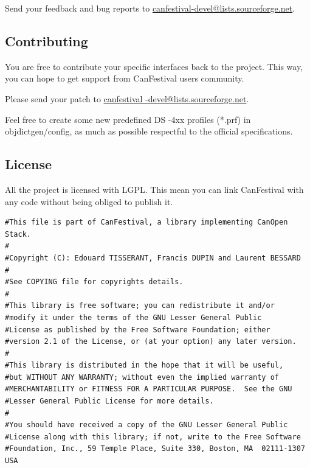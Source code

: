 \documentclass[12pt,english,a4paper]{book}
\begin{document}
Send your feedback and bug reports to \href{mailto:canfestival-devel@lists.sourceforge.net}{canfestival-devel@lists.sourceforge.net}.

\subsection{Contributing}

You are free to contribute your specific interfaces back to the project.
This way, you can hope to get support from CanFestival users community.

Please send your patch to \href{mailto:canfestival-devel@lists.sourceforge.net}{canfestival
-devel@lists.sourceforge.net}.

Feel free to create some new predefined DS -4xx profiles ({*}.prf)
in objdictgen/config, as much as possible respectful to the official
specifications.


\subsection{License}

All the project is licensed with LGPL. This mean you can link CanFestival
with any code without being obliged to publish it.


\begin{verbatim}
#This file is part of CanFestival, a library implementing CanOpen Stack. 
# 
#Copyright (C): Edouard TISSERANT, Francis DUPIN and Laurent BESSARD 
# 
#See COPYING file for copyrights details. 
# 
#This library is free software; you can redistribute it and/or 
#modify it under the terms of the GNU Lesser General Public 
#License as published by the Free Software Foundation; either 
#version 2.1 of the License, or (at your option) any later version. 
# 
#This library is distributed in the hope that it will be useful, 
#but WITHOUT ANY WARRANTY; without even the implied warranty of 
#MERCHANTABILITY or FITNESS FOR A PARTICULAR PURPOSE.  See the GNU 
#Lesser General Public License for more details. 
# 
#You should have received a copy of the GNU Lesser General Public 
#License along with this library; if not, write to the Free Software 
#Foundation, Inc., 59 Temple Place, Suite 330, Boston, MA  02111-1307  USA 
\end{verbatim}
\end{document}
